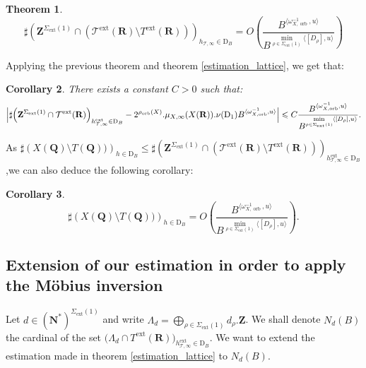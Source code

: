 \documentclass{proc-l}
\newcommand{\R}{\mathbf{R}}
\newcommand{\Z}{\mathbf{Z}}
\newcommand{\N}{\mathbf{N}}
\newcommand{\Q}{\mathbf{Q}}
\DeclareMathOperator{\orb}{orb}
\DeclareMathOperator{\ext}{ext}
\newcommand{\stackT}{\mathcal{T}}
\newcommand{\w}{\omega}
\newtheorem{theorem}{Theorem}[section]
\newtheorem{cor}[theorem]{Corollary}
\theoremstyle{definition}
\theoremstyle{remark}
\numberwithin{equation}{section}
\begin{document}
\begin{theorem}\label{number_of_points_complementary_of_the_torus_universal_torsor}
    $$ \sharp\left(\Z^{\Sigma_{\ext}(1)} \cap (\stackT^{\ext}(\R) \setminus T^{\ext}(\R)) \right)_{h_{\stackT,\infty} \in \mathrm{D}_B} = O\left( \frac{B^{\langle \w_{X,\orb}^{-1} , u \rangle}}{B^{\min\limits_{\rho \in \Sigma_{\ext}(1)} \langle [D_{\rho}] , u \rangle }} \right)$$
\end{theorem}

Applying the previous theorem and theorem \ref{estimation_lattice}, we get that:

\begin{cor}
    There exists a constant $C > 0$ such that:
    $$\Big| \sharp \Bigl( \Z^{\Sigma_{\ext}(1)} \cap \stackT^{\ext}(\R) \Bigr)_{h^{\ext}_{\stackT,\infty} \in \mathrm{D}_{B}}  - 2^{\rho_{\orb}(X)} . \mu_{X,\infty}(X(\R)). \nu(\mathrm{D}_1) B^{ \langle \w_{X,\orb}^{-1} , u \rangle } \Big| \leqslant C \frac{B^{\langle \w_{X,\orb}^{-1},u\rangle}}{B^{ \min\limits_{\rho \in \Sigma_{\ext}(1)} \langle [D_{\rho}],u\rangle } } .$$

\end{cor}

As $\sharp\left(X(\Q) \setminus T(\Q)) \right)_{h \in \mathrm{D}_B} \leqslant \sharp\left(\Z^{\Sigma_{\ext}(1)} \cap (\stackT^{\ext}(\R) \setminus T^{\ext}(\R)) \right)_{h^{\ext}_{\stackT,\infty} \in \mathrm{D}_B}$,we can also deduce the following corollary:

\begin{cor}\label{number_of_points_complementary_of_the_torus_variety}
    $$ \sharp\left(X(\Q) \setminus T(\Q)) \right)_{h \in \mathrm{D}_B} = O\left( \frac{B^{\langle \w_{X,\orb}^{-1} , u \rangle}}{B^{\min\limits_{\rho \in \Sigma_{\ext}(1)} \langle [D_{\rho}] , u \rangle }} \right) .$$
\end{cor}






\subsection{Extension of our estimation in order to apply the Möbius inversion}

Let $d \in (\N^*)^{\Sigma_{\ext}(1)}$ and write $\Lambda_d = \bigoplus\limits_{\rho \in \Sigma_{\ext}(1)} d_{\rho}.\Z$. We shall denote $N_d(B)$ the cardinal of the set $\Big( \Lambda_d \cap T^{\ext}(\R) \Big)_{h^{\ext}_{\stackT,\infty} \in \mathrm{D}_{B}}$. We want to extend the estimation made in theorem \ref{estimation_lattice} to $N_d(B)$.
\end{document}
